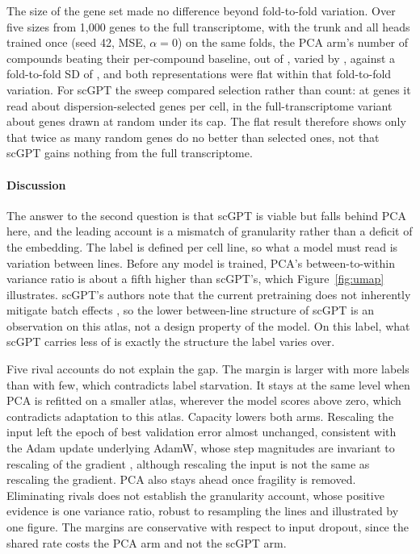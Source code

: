 The size of the gene set made no difference beyond fold-to-fold variation. Over five sizes from
1{,}000 genes to the full transcriptome, with the trunk and all \NDrugsModelled{} heads trained once
(seed 42, MSE, $\alpha = 0$) on the same folds, the PCA arm's number of compounds beating their
per-compound baseline, out of \NDrugsModelled{}, varied by \SweepRangePca{}, against a fold-to-fold SD of
\SweepFoldSd{}, and both representations were flat within that fold-to-fold variation. For scGPT the sweep compared
selection rather than count: at \NHvg{} genes it read about \GenesSeenHvg{} dispersion-selected genes per
cell, in the full-transcriptome variant about \GenesSeenAll{} genes drawn at random under its cap. The
flat result therefore shows only that twice as many random genes do no better than selected ones, not
that scGPT gains nothing from the full transcriptome.


\paragraph{Discussion} The answer to the second question is that scGPT is viable but falls behind
PCA here, and the leading account is a mismatch of granularity rather than a deficit of the embedding.
The label is defined per cell line, so what a model must read is variation between lines. Before any
model is trained, PCA's between-to-within variance ratio is about a fifth higher than scGPT's, which
Figure~\ref{fig:umap} illustrates. scGPT's authors note that the current pretraining does not inherently
mitigate batch effects \cite{scgpt}, so the lower between-line structure of scGPT is an observation on this
atlas, not a design property of the model. On this label, what scGPT carries less of is exactly the
structure the label varies over.

Five rival accounts do not explain the gap. The margin is larger with more labels than with few, which
contradicts label starvation. It stays at the same level when PCA is refitted on a smaller atlas,
wherever the model scores above zero, which contradicts adaptation to this atlas. Capacity lowers both
arms. Rescaling the input left the epoch of best validation error almost unchanged, consistent with the
Adam update underlying AdamW, whose step magnitudes are invariant to rescaling of the gradient
\cite{kingma2015adam}, although rescaling the input is not the same as rescaling the gradient. PCA also
stays ahead once fragility is removed. Eliminating rivals does not establish the granularity account,
whose positive evidence is one variance ratio, robust to resampling the lines and illustrated by one
figure. The margins are conservative with respect to input dropout, since the
shared rate costs the PCA arm and not the scGPT arm.


